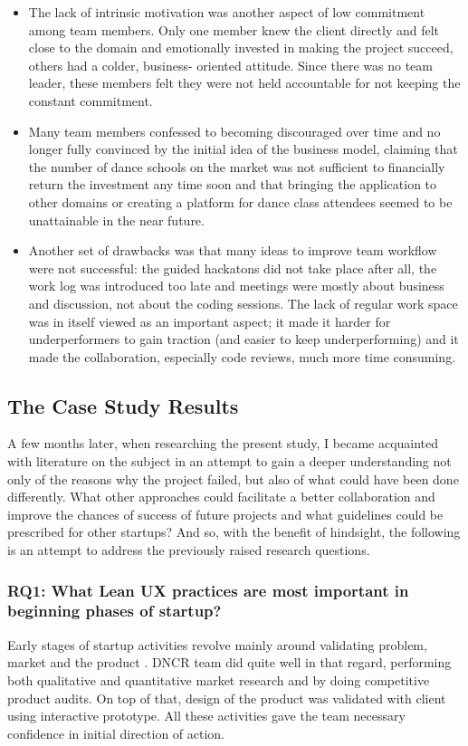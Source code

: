 \documentclass{article}
\begin{document}
\begin{itemize}
\item The lack of intrinsic motivation was another aspect of low commitment among team members. Only one member knew the client directly and felt close to the domain and emotionally invested in making the project succeed, others had a colder, business- oriented attitude. Since there was no team leader, these members felt they were not held accountable for not keeping the constant commitment.
\item Many team members confessed to becoming discouraged over time and no longer fully convinced by the initial idea of the business model, claiming that the number of dance schools on the market was not sufficient to financially return the investment any time soon and that bringing the application to other domains or creating a platform for dance class attendees seemed to be unattainable in the near future.
\item Another set of drawbacks was that many ideas to improve team workflow were not successful: the guided hackatons did not take place after all, the work log was introduced too late and meetings were mostly about business and discussion, not about the coding sessions. The lack of regular work space was in itself viewed as an important aspect; it made it harder for underperformers to gain traction (and easier to keep underperforming) and it made the collaboration, especially code reviews, much more time consuming.
\end{itemize}

\subsection{The Case Study Results}
\label{sec:research-questions}
A few months later, when researching the present study, I became acquainted with literature on the subject in an attempt to gain a deeper understanding not only of the reasons why the project failed, but also of what could have been done differently. What other approaches could facilitate a better collaboration and improve the chances of success of future projects and what guidelines could be prescribed for other startups? And so, with the benefit of hindsight, the following is an attempt to address the previously raised research questions.


\subsubsection{RQ1: What Lean UX practices are most important in beginning phases of startup?}
Early stages of startup activities revolve mainly around validating problem, market and the product \citep{klein2013ux}. DNCR team did quite well in that regard, performing both qualitative and quantitative market research and by doing competitive product audits. On top of that, design of the product was validated with client using interactive prototype. All these activities gave the team necessary confidence in initial direction of action.
\end{document}

